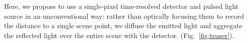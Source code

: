 

Here, we propose to use a single-pixel time-resolved detector and pulsed light
source in an unconventional way: rather than optically focusing them to record
the distance to a single scene point, we diffuse the emitted light and aggregate
the reflected light over the entire scene with the detector. 
(Fig.~\ref{fig:teaser}).








